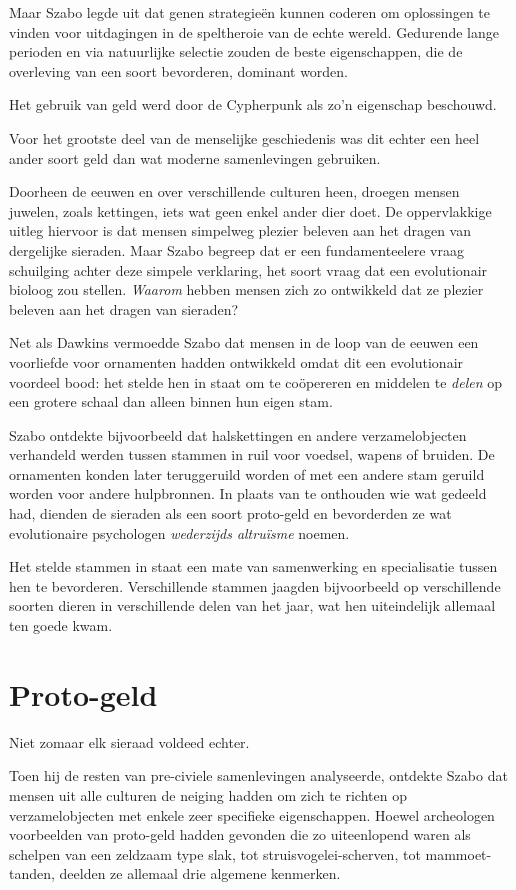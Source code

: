 \documentclass[
  a5paper,
  smalldemyvopaper,11pt,twoside,onecolumn,openright,extrafontsizes,
hidelinks]{memoir}
\begin{document}
Maar Szabo legde uit dat genen strategieën kunnen coderen om oplossingen
te vinden voor uitdagingen in de speltheroie van de echte wereld.
Gedurende lange perioden en via natuurlijke selectie zouden de beste
eigenschappen, die de overleving van een soort bevorderen, dominant
worden.

Het gebruik van geld werd door de Cypherpunk als zo'n eigenschap
beschouwd.

Voor het grootste deel van de menselijke geschiedenis was dit echter een
heel ander soort geld dan wat moderne samenlevingen gebruiken.

Doorheen de eeuwen en over verschillende culturen heen, droegen mensen
juwelen, zoals kettingen, iets wat geen enkel ander dier doet. De
oppervlakkige uitleg hiervoor is dat mensen simpelweg plezier beleven
aan het dragen van dergelijke sieraden. Maar Szabo begreep dat er een
fundamenteelere vraag schuilging achter deze simpele verklaring, het
soort vraag dat een evolutionair bioloog zou stellen. \emph{Waarom}
hebben mensen zich zo ontwikkeld dat ze plezier beleven aan het dragen
van sieraden?

Net als Dawkins vermoedde Szabo dat mensen in de loop van de eeuwen een
voorliefde voor ornamenten hadden ontwikkeld omdat dit een evolutionair
voordeel bood: het stelde hen in staat om te coöpereren en middelen te
\emph{delen} op een grotere schaal dan alleen binnen hun eigen stam.

Szabo ontdekte bijvoorbeeld dat halskettingen en andere verzamelobjecten
verhandeld werden tussen stammen in ruil voor voedsel, wapens of
bruiden. De ornamenten konden later teruggeruild worden of met een
andere stam geruild worden voor andere hulpbronnen. In plaats van te
onthouden wie wat gedeeld had, dienden de sieraden als een soort
proto-geld en bevorderden ze wat evolutionaire psychologen
\emph{wederzijds altruïsme} noemen.

Het stelde stammen in staat een mate van samenwerking en specialisatie
tussen hen te bevorderen. Verschillende stammen jaagden bijvoorbeeld op
verschillende soorten dieren in verschillende delen van het jaar, wat
hen uiteindelijk allemaal ten goede kwam.

\section{Proto-geld}\label{proto-geld}

Niet zomaar elk sieraad voldeed echter.

Toen hij de resten van pre-civiele samenlevingen analyseerde, ontdekte
Szabo dat mensen uit alle culturen de neiging hadden om zich te richten
op verzamelobjecten met enkele zeer specifieke eigenschappen. Hoewel
archeologen voorbeelden van proto-geld hadden gevonden die zo
uiteenlopend waren als schelpen van een zeldzaam type slak, tot
struisvogelei-scherven, tot mammoet-tanden, deelden ze allemaal drie
algemene kenmerken.
\end{document}
